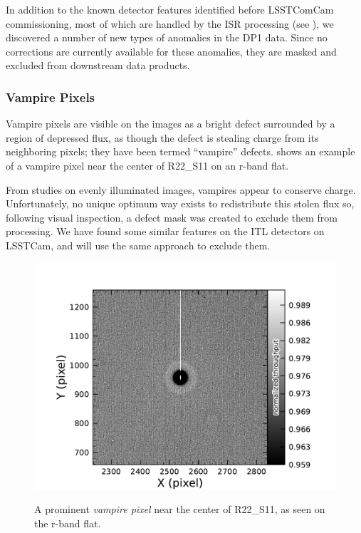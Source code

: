 In addition to the known detector features identified before LSSTComCam commissioning, most of which are handled by the ISR processing (see ), we discovered a number of new types of anomalies in the DP1 data. 
Since no corrections are currently available for these anomalies, they are masked and excluded from downstream data products.

\subsubsection{Vampire Pixels}
Vampire pixels are visible on the images as a bright defect surrounded by a region of depressed flux, as though the defect is stealing charge from its neighboring pixels; they have been termed ``vampire'' defects.
 shows an example of a vampire pixel near the center of R22\_S11 on an r-band flat.

From studies on evenly illuminated images, vampires appear to conserve charge.
Unfortunately, no unique optimum way exists to redistribute this stolen flux so, following visual inspection, a defect mask was created to exclude them from processing.
We have found some similar features on the ITL detectors on LSSTCam, and will use the same approach to exclude them.
\begin{figure}[htb!]
  \centering
  \includegraphics[width=0.98\linewidth]{figures/dp1_isr_anomalies-vampire_pixel.pdf}
  \label{fig:anomalies_vampire_pixels}
  \caption{
    A prominent \textit{vampire pixel} near the center of R22\_S11, as seen on the r-band flat.
  }
\end{figure}

